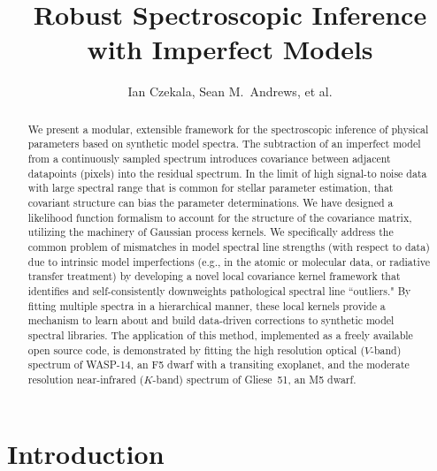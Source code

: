 \documentclass[iop,floatfix,numberedappendix,twocolappendix]{emulateapj}
\begin{document}
\graphicspath{{figs/}}



\title{Robust Spectroscopic Inference with Imperfect Models}

\author{Ian Czekala, Sean M.~Andrews, et al.}

\begin{abstract}
We present a modular, extensible framework for the spectroscopic inference of 
physical parameters based on synthetic model spectra.  The subtraction of an 
imperfect model from a continuously sampled spectrum introduces covariance 
between adjacent datapoints (pixels) into the residual spectrum.  In the limit 
of high signal-to noise data with large spectral range that is common for 
stellar parameter estimation, that covariant structure can bias the parameter 
determinations.  We have designed a likelihood function formalism to account 
for the structure of the covariance matrix, utilizing the machinery of Gaussian 
process kernels.  We specifically address the common problem of mismatches in 
model spectral line strengths (with respect to data) due to intrinsic model 
imperfections (e.g., in the atomic or molecular data, or radiative transfer 
treatment) by developing a novel local covariance kernel framework that 
identifies and self-consistently downweights pathological spectral line 
``outliers."  By fitting multiple spectra in a hierarchical manner, these local 
kernels provide a mechanism to learn about and build data-driven corrections to 
synthetic model spectral libraries.  The application of this method, 
implemented as a freely available open source code, is demonstrated by fitting 
the high resolution optical ($V$-band) spectrum of WASP-14, an F5 dwarf with a 
transiting exoplanet, and the moderate resolution near-infrared ($K$-band) 
spectrum of Gliese~51, an M5 dwarf. 
\end{abstract}




\section{Introduction} \label{sec:intro}
\end{document}
